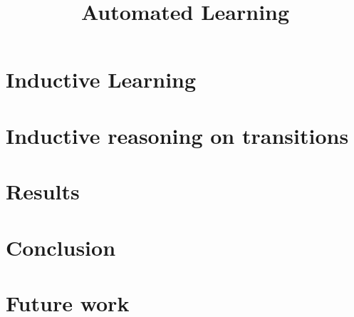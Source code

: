 \documentclass[english]{report}
\title {Automated Learning}
\begin{document}
\maketitle
\tableofcontents

\chapter{Inductive Learning}
    

\chapter{Inductive reasoning on transitions}
    

\chapter{Results}

\chapter{Conclusion}

\chapter{Future work}

{}

\end{document}
